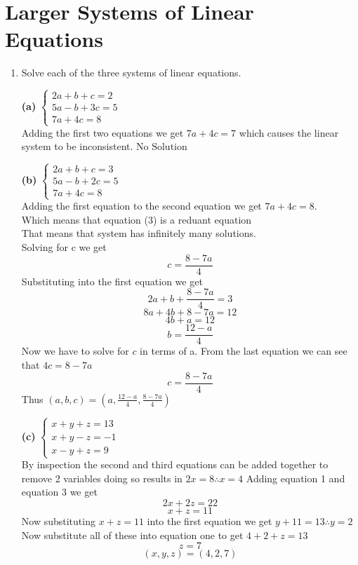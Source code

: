 \documentclass[10pt]{article}
\begin{document}
\section{Larger Systems of Linear Equations}
    \begin{enumerate}
        \item Solve each of the three systems of linear equations.\\[0.5em]
        \noindent
        \begin{minipage}[t]{0.31\textwidth}
          \textbf{(a)}
          $
          \begin{cases}
            2a+b+c=2\\
            5a-b+3c=5 \\
            7a+4c=8
          \end{cases}
          $ \\[6pt]
          Adding the first two equations we get $7a+4c=7$ which causes the linear system to be inconsistent. $\boxed{\text{No Solution}}$
        \end{minipage}\hfill
        \begin{minipage}[t]{0.31\textwidth}
          \textbf{(b)}
          $
          \begin{cases}
            2a+b+c=3\\
            5a-b+2c=5 \\
            7a+4c=8
          \end{cases}
          $ \\[6pt]
          Adding the first equation to the second equation we get $7a+4c=8$.\\ Which means that equation (3) is a reduant equation \\ That means that system has infinitely many solutions.\\  Solving for c we get $$c=\frac{8-7a}{4}$$
          Substituting into the first equation we get $$2a+b+\frac{8-7a}{4}=3$$
          $$8a+4b+8-7a=12$$
          $$4b+a=12$$ $$b=\frac{12-a}{4}$$
          Now we have to solve for $c$ in terms of a. From the last equation we can see that $4c=8-7a$ $$c=\frac{8-7a}{4}$$
          Thus $\boxed{(a,b,c)= \left(a,\frac{12-a}{4},\frac{8-7a}{4} \right)}$ 
        \end{minipage}\hfill
        \begin{minipage}[t]{0.31\textwidth}
          \textbf{(c)}
          $
          \begin{cases}
            x+y+z=13\\
            x+y-z=-1 \\
            x-y+z=9
          \end{cases}
          $ \\
          By inspection the second and third equations can be added together to remove 2 variables doing so results in $2x=8 \therefore x=4$
          Adding equation 1 and equation 3 we get $$2x+2z=22$$ $$x+z=11$$
          Now substituting $x+z=11$ into the first equation we get $y+11=13 \therefore y=2$ 
          Now substitute all of these into equation one to get $4+2+z=13$ $$z=7$$
            $$\boxed{(x,y,z) = (4,2,7)}$$
        \end{minipage}


\end{enumerate}
\end{document}
